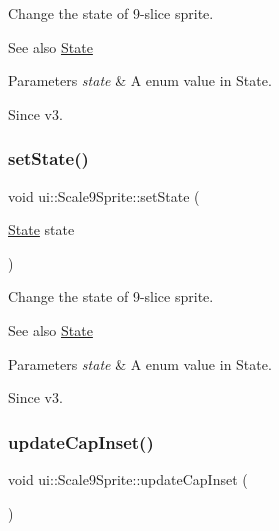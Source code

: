 Change the state of 9-\/slice sprite. \begin{DoxySeeAlso}{See also}
{\ttfamily \hyperlink{classui_1_1Scale9Sprite_a6580c2817c63b7a2461c48378b199d79}{State}} 
\end{DoxySeeAlso}

\begin{DoxyParams}{Parameters}
{\em state} & A enum value in State. \\
\hline
\end{DoxyParams}
\begin{DoxySince}{Since}
v3. 
\end{DoxySince}
\mbox{\label{classui_1_1Scale9Sprite_a511b07afa3ccc53fbd2e33f0dca78e8c}} 
\subsubsection{\texorpdfstring{set\+State()}{setState()}\hspace{0.1cm}{\footnotesize\ttfamily [2/2]}}
{\footnotesize\ttfamily void ui\+::\+Scale9\+Sprite\+::set\+State (\begin{DoxyParamCaption}\item[{\hyperlink{classui_1_1Scale9Sprite_a6580c2817c63b7a2461c48378b199d79}{State}}]{state }\end{DoxyParamCaption})}

Change the state of 9-\/slice sprite. \begin{DoxySeeAlso}{See also}
{\ttfamily \hyperlink{classui_1_1Scale9Sprite_a6580c2817c63b7a2461c48378b199d79}{State}} 
\end{DoxySeeAlso}

\begin{DoxyParams}{Parameters}
{\em state} & A enum value in State. \\
\hline
\end{DoxyParams}
\begin{DoxySince}{Since}
v3. 
\end{DoxySince}
\mbox{\label{classui_1_1Scale9Sprite_af3e2f3817d4b639649c8ce063c437e5b}} 
\subsubsection{\texorpdfstring{update\+Cap\+Inset()}{updateCapInset()}}
{\footnotesize\ttfamily void ui\+::\+Scale9\+Sprite\+::update\+Cap\+Inset (\begin{DoxyParamCaption}{ }\end{DoxyParamCaption})\hspace{0.3cm}{\ttfamily [protected]}}


